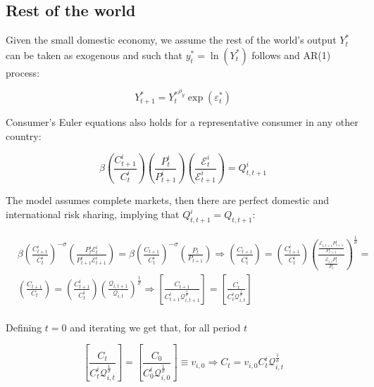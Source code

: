 \documentclass{article}
\newcommand{\E}{\mathcal{E}}
\begin{document}
\subsection{Rest of the world}
Given the small domestic economy, we assume the rest of the world's output $Y_t^*$ can be taken as exogenous and such that $y_t^* = \ln(Y^*_t)$ follows and AR(1) process:

\begin{equation}
    \label{y_row}
    Y^*_{t+1} = {Y^*_t}^{\rho_y}\exp( \varepsilon^*_t)
\end{equation}

Consumer's Euler equations also holds for a representative consumer in any other country:

$$\beta \left( \frac{C^i_{t+1}}{C_t^i} \right) \left( \frac{P_t^i}{P^i_{t+1}} \right) \left( \frac{\E^i_t}{\E^i_{t+1}} \right) = Q^i_{t, t+1}$$

The model assumes complete markets, then there are perfect domestic and international risk sharing, implying that $Q^i_{t, t+1} = Q_{t,t+1}$:

\begin{equation}
\begin{array}{cc}
     &\beta \left( \frac{C^i_{t+1}}{C_t^i} \right)^{-\sigma} \left( \frac{P_t^i \E^i_t}{P^i_{t+1} \E^i_{t+1}} \right) = \beta \left( \frac{C_{t+1}}{C_t^i} \right)^{-\sigma} \left( \frac{P_t}{P_{t+1}} \right) \Rightarrow \left( \frac{C_{t+1}}{C_t^i} \right) = \left( \frac{C^i_{t+1}}{C_t^i} \right) \left(\frac{\frac{\E_{i,t+1} P^i_{t+1}}{P_{t+1}}}{\frac{\E_{i,t} P^i_{t}}{P_{t}}} \right)^{\frac{1}{\sigma}} = \\
     &\left( \frac{C_{t+1}}{C_t} \right) = \left( \frac{C^i_{t+1}}{C_t^i} \right) \left(\frac{\mathcal{Q}_{i,t+1}}{\mathcal{Q}_{i,t}} \right)^{\frac{1}{\sigma}} \Rightarrow \left[\frac{C_{t+1}}{C^i_{t+1} \mathcal Q_{i,t+1}^{\frac{1}{\sigma}}}\right] =  \left[\frac{C_t}{C^i_t \mathcal Q_{i,t}^{\frac{1}{\sigma}}} \right] \\
\end{array}
\end{equation}

Defining $t = 0$ and iterating we get that, for all period $t$

\begin{equation}
    \left[\frac{C_{t}}{C^i_{t} \mathcal Q_{i,t}^{\frac{1}{\sigma}}}\right] =  \left[\frac{C_0}{C^i_0 \mathcal Q_{i,0}^{\frac{1}{\sigma}}} \right] \equiv v_{i, 0} \Rightarrow C_t = v_{i,0} C^i_t \mathcal Q_{i,t}^{\frac{1}{\sigma}}
\end{equation}
\end{document}

